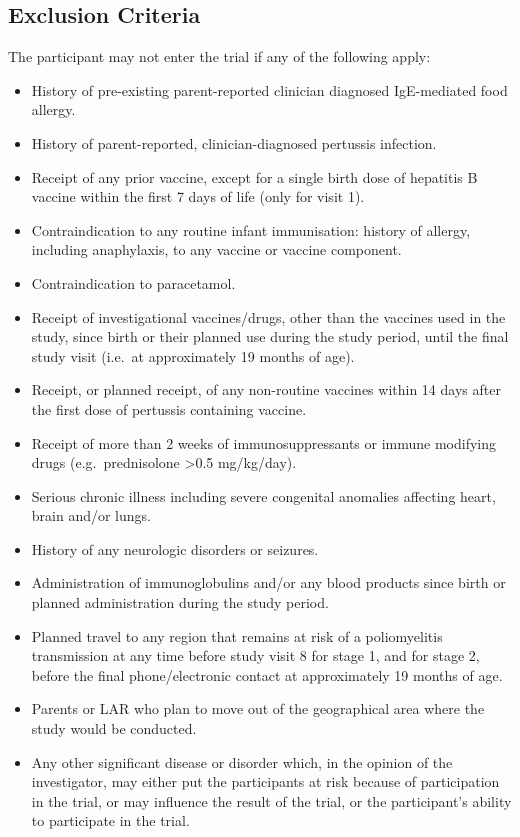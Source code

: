 \documentclass{bmcart}
\begin{document}
\subsection*{Exclusion Criteria}

The participant may not enter the trial if any of the following apply:

\begin{itemize}
	\item History of pre-existing parent-reported clinician diagnosed IgE-mediated food allergy.
	\item History of parent-reported, clinician-diagnosed pertussis infection.
	\item Receipt of any prior vaccine, except for a single birth dose of hepatitis B vaccine within the first 7 days of life (only for visit 1).
	\item Contraindication to any routine infant immunisation: history of allergy, including anaphylaxis, to any vaccine or vaccine component.
	\item Contraindication to paracetamol.
	\item Receipt of investigational vaccines/drugs, other than the vaccines used in the study, since birth or their planned use during the study period, until the final study visit (i.e.~at approximately 19 months of age).
	\item Receipt, or planned receipt, of any non-routine vaccines within 14 days after the first dose of pertussis containing vaccine.
	\item Receipt of more than 2 weeks of immunosuppressants or immune modifying drugs (e.g.~prednisolone \textgreater0.5 mg/kg/day).
	\item Serious chronic illness including severe congenital anomalies affecting heart, brain and/or lungs.
	\item History of any neurologic disorders or seizures.
	\item Administration of immunoglobulins and/or any blood products since birth or planned administration during the study period.
	\item Planned travel to any region that remains at risk of a poliomyelitis transmission at any time before study visit 8 for stage 1, and for stage 2, before the final phone/electronic contact at approximately 19 months of age.
	\item Parents or LAR who plan to move out of the geographical area where the study would be conducted.
	\item Any other significant disease or disorder which, in the opinion of the investigator, may either put the participants at risk because of participation in the trial, or may influence the result of the trial, or the participant's ability to participate in the trial.
\end{itemize}
\end{document}
